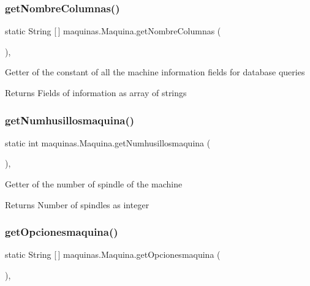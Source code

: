 \subsubsection{\texorpdfstring{get\+Nombre\+Columnas()}{getNombreColumnas()}}
{\footnotesize\ttfamily static String \mbox{[}$\,$\mbox{]} maquinas.\+Maquina.\+get\+Nombre\+Columnas (\begin{DoxyParamCaption}{ }\end{DoxyParamCaption})\hspace{0.3cm}{\ttfamily [inline]}, {\ttfamily [static]}}

Getter of the constant of all the machine information fields for database queries

\begin{DoxyReturn}{Returns}
Fields of information as array of strings 
\end{DoxyReturn}
\mbox{\label{classmaquinas_1_1_maquina_a3107d0b82d1a52fce00723abdd6d47b2}} 
\subsubsection{\texorpdfstring{get\+Numhusillosmaquina()}{getNumhusillosmaquina()}}
{\footnotesize\ttfamily static int maquinas.\+Maquina.\+get\+Numhusillosmaquina (\begin{DoxyParamCaption}{ }\end{DoxyParamCaption})\hspace{0.3cm}{\ttfamily [inline]}, {\ttfamily [static]}}

Getter of the number of spindle of the machine

\begin{DoxyReturn}{Returns}
Number of spindles as integer 
\end{DoxyReturn}
\mbox{\label{classmaquinas_1_1_maquina_af991a3b43334a33919d562d5a76e1d38}} 
\subsubsection{\texorpdfstring{get\+Opcionesmaquina()}{getOpcionesmaquina()}}
{\footnotesize\ttfamily static String \mbox{[}$\,$\mbox{]} maquinas.\+Maquina.\+get\+Opcionesmaquina (\begin{DoxyParamCaption}{ }\end{DoxyParamCaption})\hspace{0.3cm}{\ttfamily [inline]}, {\ttfamily [static]}}

